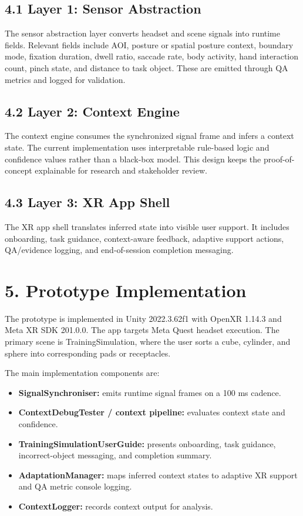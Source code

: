 \documentclass[
  10pt,
]{article}
\providecommand{\tightlist}{%
  \setlength{\itemsep}{0pt}\setlength{\parskip}{0pt}}
\begin{document}
\subsection{4.1 Layer 1: Sensor
Abstraction}\label{layer-1-sensor-abstraction}

The sensor abstraction layer converts headset and scene signals into
runtime fields. Relevant fields include AOI, posture or spatial posture
context, boundary mode, fixation duration, dwell ratio, saccade rate,
body activity, hand interaction count, pinch state, and distance to task
object. These are emitted through QA metrics and logged for validation.

\subsection{4.2 Layer 2: Context Engine}\label{layer-2-context-engine}

The context engine consumes the synchronized signal frame and infers a
context state. The current implementation uses interpretable rule-based
logic and confidence values rather than a black-box model. This design
keeps the proof-of-concept explainable for research and stakeholder
review.

\subsection{4.3 Layer 3: XR App Shell}\label{layer-3-xr-app-shell}

The XR app shell translates inferred state into visible user support. It
includes onboarding, task guidance, context-aware feedback, adaptive
support actions, QA/evidence logging, and end-of-session completion
messaging.

\section{5. Prototype Implementation}\label{prototype-implementation}

The prototype is implemented in Unity 2022.3.62f1 with OpenXR 1.14.3 and
Meta XR SDK 201.0.0. The app targets Meta Quest headset execution. The
primary scene is TrainingSimulation, where the user sorts a cube,
cylinder, and sphere into corresponding pads or receptacles.

The main implementation components are:

\begin{itemize}
\tightlist
\item
  \textbf{SignalSynchroniser:} emits runtime signal frames on a 100 ms
  cadence.
\item
  \textbf{ContextDebugTester / context pipeline:} evaluates context
  state and confidence.
\item
  \textbf{TrainingSimulationUserGuide:} presents onboarding, task
  guidance, incorrect-object messaging, and completion summary.
\item
  \textbf{AdaptationManager:} maps inferred context states to adaptive
  XR support and QA metric console logging.
\item
  \textbf{ContextLogger:} records context output for analysis.
\end{itemize}
\end{document}
